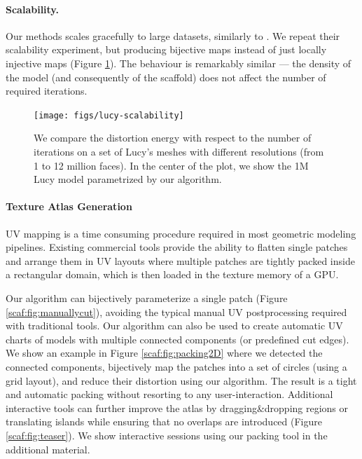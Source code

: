 
\paragraph{Scalability.} Our methods scales gracefully to large datasets, similarly to \cite{Rabinovich:2017}. We repeat their scalability experiment, but producing bijective maps instead of just locally injective maps (Figure \ref{scaf:fig:scalability}). The behaviour is remarkably similar --- the density of the model (and consequently of the scaffold) does not affect the number of required iterations. 

\begin{figure}[t]
\texttt{[image: figs/lucy-scalability]}
\caption{We compare the distortion energy with respect to the number of iterations on a set of Lucy's meshes with different resolutions (from 1 to 12 million faces). In the center of the plot, we show the 1M Lucy model parametrized by our algorithm.
}
\label{scaf:fig:scalability}
\end{figure}

\paragraph{Texture Atlas Generation} 

UV mapping is a time consuming procedure required in most geometric modeling pipelines. Existing commercial tools provide the ability to flatten single patches and arrange them in UV layouts where multiple patches are tightly packed inside a rectangular domain, which is then loaded in the texture memory of a GPU. 

Our algorithm can bijectively parameterize a single patch (Figure \ref{scaf:fig:manuallycut}), avoiding the typical manual UV postprocessing required with traditional tools.  Our algorithm can also be used to create automatic UV charts of models with multiple connected components (or predefined cut edges). We show an example in Figure \ref{scaf:fig:packing2D} where we detected the connected components, bijectively map the patches into a set of circles (using a grid layout), and reduce their distortion using our algorithm. The result is a tight and automatic packing without resorting to any user-interaction. Additional interactive tools can further improve the atlas by dragging\&dropping regions or translating islands while ensuring that no overlaps are introduced (Figure \ref{scaf:fig:teaser}). We show interactive sessions using our packing tool in the additional material.

